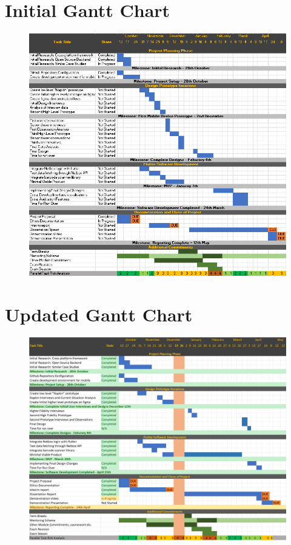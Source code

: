 \documentclass [11pt,a4paper]{article}
\begin{document}
\section{Initial Gantt Chart}
\label{sec:init_gantt_charts}
\begin{figure}[H]
    \centering
    \includegraphics[width=1\textwidth]{images/keeptrack-gantt-initial.png}
\end{figure}

\section{Updated Gantt Chart}
\label{sec:updated_gantt_charts}
\begin{figure}[H]
    \centering
    \includegraphics[width=1\textwidth]{images/keeptrack-gantt-final.png}
\end{figure}
\end{document}
